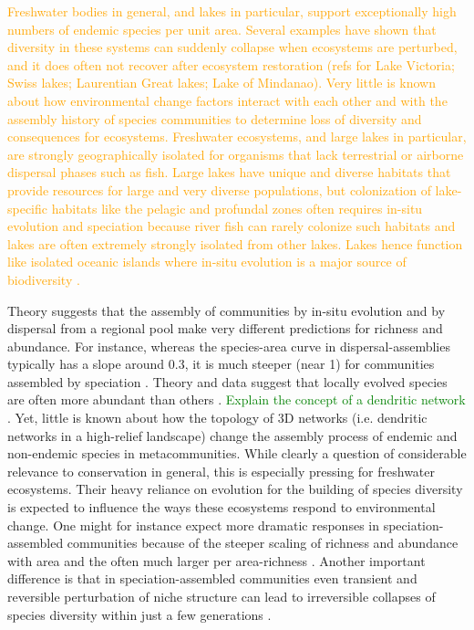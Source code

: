 \documentclass[12pt]{article}
\newcommand{\greg}[1]{\textcolor{Green}{#1}}
\newcommand{\tim}[1]{\textcolor{Orange}{#1}}
\begin{document}
\tim{Freshwater bodies in general, and lakes in particular, support
exceptionally high numbers of endemic species per unit area. Several
examples have shown that diversity in these systems can suddenly
collapse when ecosystems are perturbed, and it does often not recover
after ecosystem restoration (refs for Lake Victoria; Swiss lakes;
Laurentian Great lakes; Lake of Mindanao). Very little is known about
how environmental change factors interact with each other and with the
assembly history of species communities to determine loss of diversity
and consequences for ecosystems. Freshwater ecosystems, and large
lakes in particular, are strongly geographically isolated for
organisms that lack terrestrial or airborne dispersal phases such as
fish. Large lakes have unique and diverse habitats that provide
resources for large and very diverse populations, but colonization of
lake-specific habitats like the pelagic and profundal zones often
requires in-situ evolution and speciation because river fish can
rarely colonize such habitats and lakes are often extremely strongly
isolated from other lakes. Lakes hence function like isolated oceanic
islands where in-situ evolution is a major source of biodiversity \citep{Hudson_Rapid_2011,Wagner_Cichlid_2014}.}

Theory suggests that the assembly of communities by in-situ evolution
and by dispersal from a regional pool make very different predictions
for richness and abundance. For instance, whereas the species-area
curve in dispersal-assemblies typically has a slope around 0.3, it is
much steeper (near 1) for communities assembled by speciation
 \citep{Rosenzweig_Loss_2001,Wagner_Cichlid_2014}. Theory and data suggest
that locally evolved species are often more abundant than others
\citep{Rosindell_unified_2011}. \greg{Explain the concept of a dendritic network} \citep{campbell_grant_living_2007}. Yet, little is known about how the
topology of 3D networks (i.e. dendritic networks in a high-relief landscape)  change the assembly process of endemic and non-endemic species in metacommunities. While clearly a question of considerable relevance to conservation in general, this is especially pressing for freshwater ecosystems. Their heavy reliance on evolution for the building of species diversity is expected to influence the
ways these ecosystems respond to environmental change. One might for
instance expect more dramatic responses in speciation-assembled
communities because of the steeper scaling of richness and abundance
with area and the often much larger per area-richness  \citep{Wagner_Cichlid_2014}. Another important difference is that in
speciation-assembled communities even transient and reversible
perturbation of niche structure can lead to irreversible collapses of
species diversity within just a few generations  \citep{Seehausen_Cichlid_1997, Vonlanthen_Eutrophication_2012}.
\end{document}
